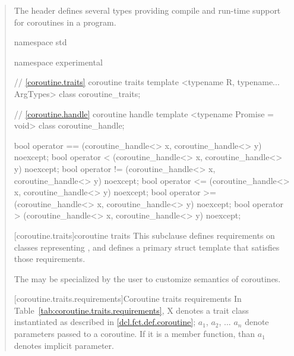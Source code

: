 \begin{quote}

\pnum
The header
defines several types providing compile and run-time support for coroutines in a \Cpp program.


%
%
\begin{codeblock}
namespace std {
namespace experimental {
  // \ref{coroutine.traits} coroutine traits
  template <typename R, typename... ArgTypes>
    class coroutine_traits;
	
  // \ref{coroutine.handle} coroutine handle
  template <typename Promise = void>
    class coroutine_handle;		
	
  bool operator == (coroutine_handle<> x, coroutine_handle<> y) noexcept;
  bool operator < (coroutine_handle<> x, coroutine_handle<> y) noexcept;			
  bool operator != (coroutine_handle<> x, coroutine_handle<> y) noexcept;
  bool operator <= (coroutine_handle<> x, coroutine_handle<> y) noexcept;			
  bool operator >= (coroutine_handle<> x, coroutine_handle<> y) noexcept;
  bool operator > (coroutine_handle<> x, coroutine_handle<> y) noexcept;			
}
}
\end{codeblock}

[coroutine.traits]{coroutine traits}
\pnum
This subclause defines requirements on classes representing
,
and defines a primary struct template
that satisfies those requirements.


\pnum
The  may be specialized by the user 
to customize semantics of coroutines.

[coroutine.traits.requirements]{Coroutine traits requirements}
\pnum
In Table~\ref{tab:coroutine.traits.requirements}, X denotes 
a trait class instantiated as described in \ref{dcl.fct.def.coroutine};
$a_1$, $a_2$, ... $a_n$ denote parameters passed to a coroutine. If it is a member function, than $a_1$ denotes implicit  parameter.


\end{quote}

